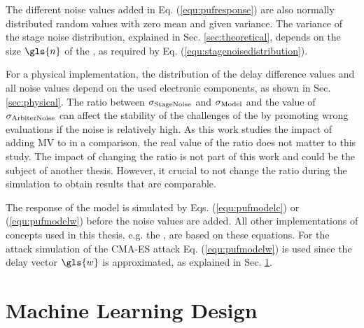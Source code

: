 The different noise values added in Eq. (\ref{equ:pufresponse}) are also normally distributed random values with zero mean and given variance.
The variance of the stage noise distribution, explained in Sec. \ref{sec:theoretical}, depends on the size $\gls{n}$ of the \apuf, as required by Eq. (\ref{equ:stagenoisedistribution}).

For a physical \apuf implementation, the distribution of the delay difference values and all noise values depend on the used electronic components, as shown in Sec. \ref{sec:physical}.
The ratio between $\sigma_{\mathrm{Stage Noise}}$ and $\sigma_{\mathrm{Model}}$ and the value of $\sigma_{\mathrm{Arbiter Noise}}$ can affect the stability of the challenges of the \apuf by promoting wrong \puf evaluations if the noise is relatively high.
As this work studies the impact of adding \ac{MV} to \apufs in a comparison, the real value of the ratio does not matter to this study.
The impact of changing the ratio is not part of this work and could be the subject of another thesis. 
However, it crucial to not change the ratio during the simulation to obtain results that are comparable.

The response of the \apuf model is simulated by Eqs. (\ref{equ:pufmodelc}) or (\ref{equ:pufmodelw}) before the noise values are added.
All other implementations of \puf concepts used in this thesis, e.g. the \mpuf, are based on these \apuf equations.
For the attack simulation of the \ac{CMA-ES} attack Eq. (\ref{equ:pufmodelw}) is used since the delay vector $\gls{w}$ is approximated, as explained in Sec. \ref{sec:machinelearningdesign}.


\section{Machine Learning Design}
\label{sec:machinelearningdesign}


